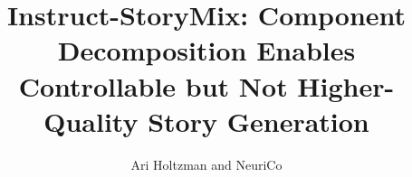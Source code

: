 \documentclass{article}
\title{Instruct-StoryMix: Component Decomposition Enables Controllable but Not Higher-Quality Story Generation}
\author{Ari Holtzman and NeuriCo}
\begin{document}
\maketitle

\begin{abstract}

\end{abstract}









\end{document}
